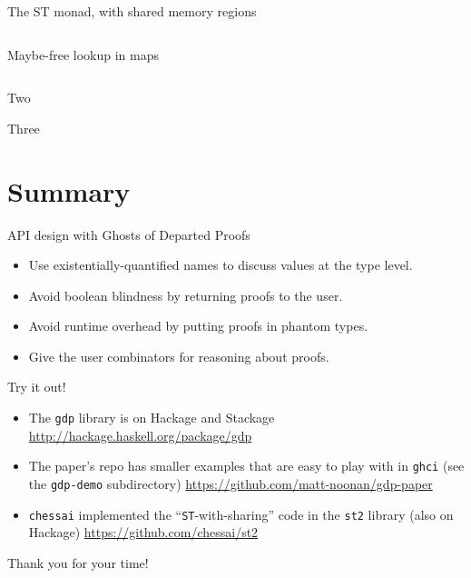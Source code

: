 \documentclass{beamer}
\begin{document}
\usebackgroundtemplate{}
\begin{frame}{The ST monad, with shared memory regions}
  \inputminted{haskell}{st2.hs}
\end{frame}

\begin{frame}{Maybe-free lookup in maps}
  \inputminted{haskell}{jmap.hs}
\end{frame}

\begin{frame}{Two}

\end{frame}

\begin{frame}{Three}

\end{frame}

  \section{Summary}   %
\begin{frame}{API design with Ghosts of Departed Proofs}
  \begin{itemize}
  \item{Use \alert{existentially-quantified names} to discuss values at the type level.}
  \bigskip
  \item{Avoid boolean blindness by \alert{returning proofs to the user}.}
  \bigskip
  \item{Avoid runtime overhead by putting \alert{proofs in phantom types}.}
  \bigskip
  \item{Give the user \alert{combinators for reasoning} about proofs.}
  \end{itemize}

\end{frame}


\begin{frame}{Try it out!}
  \begin{itemize}
  \item{The \texttt{gdp} library is on Hackage and Stackage
    \url{http://hackage.haskell.org/package/gdp}\medskip
  }
  \item{The paper's repo has smaller examples that are easy to play with
    in \texttt{ghci} (see the \texttt{gdp-demo} subdirectory)
    \url{https://github.com/matt-noonan/gdp-paper}\medskip}
  \item{\texttt{chessai} implemented the ``\texttt{ST}-with-sharing'' code
    in the \texttt{st2} library (also on Hackage) \url{https://github.com/chessai/st2}}
  \end{itemize}
  \medskip
  \Large{Thank you for your time!}
\end{frame}
\end{document}
